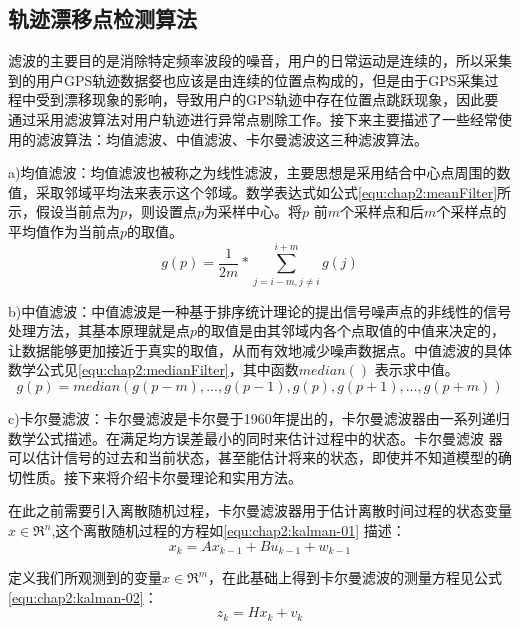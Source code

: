 \subsection{轨迹漂移点检测算法}
\label{sec:section2-1-1}
滤波的主要目的是消除特定频率波段的噪音，用户的日常运动是连续的，所以采集到的用户GPS轨迹数据㛑也应该是由连续的位置点构成的，但是由于GPS采集过程中受到漂移现象的影响，导致用户的GPS轨迹中存在位置点跳跃现象，因此要通过采用滤波算法对用户轨迹进行异常点剔除工作。接下来主要描述了一些经常使用的滤波算法：均值滤波、中值滤波、卡尔曼滤波这三种滤波算法。
\par a)均值滤波：均值滤波也被称之为线性滤波，主要思想是采用结合中心点周围的数值，采取邻域平均法来表示这个邻域。数学表达式如公式\ref{equ:chap2:meanFilter}所示，假设当前点为$p$，则设置点$p$为采样中心。将$p$ 前$m$个采样点和后$m$个采样点的平均值作为当前点$p$的取值。
\begin{equation}
\label{equ:chap2:meanFilter}
g(p)=\frac{1}{2m} \ast \sum_{j=i-m,j\neq i}^{i+m}g(j)
\end{equation}
\par b)中值滤波：中值滤波是一种基于排序统计理论的提出信号噪声点的非线性的信号处理方法，其基本原理就是点$p$的取值是由其邻域内各个点取值的中值来决定的，让数据能够更加接近于真实的取值，从而有效地减少噪声数据点。中值滤波的具体数学公式见\ref{equ:chap2:medianFilter}，其中函数$median()$ 表示求中值。
\begin{equation}
\label{equ:chap2:medianFilter}
g(p)=median({g(p-m),...,g(p-1),g(p),g(p+1),...,g(p+m)})
\end{equation}
\par c)卡尔曼滤波：卡尔曼滤波是卡尔曼于1960年提出的，卡尔曼滤波器由一系列递归数学公式描述。在满足均方误差最小的同时来估计过程中的状态。卡尔曼滤波
器可以估计信号的过去和当前状态，甚至能估计将来的状态，即使并不知道模型的确切性质。接下来将介绍卡尔曼理论和实用方法。
\par 在此之前需要引入离散随机过程，卡尔曼滤波器用于估计离散时间过程的状态变量$x\in \Re^{n}$,这个离散随机过程的方程如\ref{equ:chap2:kalman-01} 描述：
\begin{equation}
\label{equ:chap2:kalman-01}
x_{k}=Ax_{k-1}+Bu_{k-1}+w_{k-1}
\end{equation}
\par 定义我们所观测到的变量$x\in \Re^{m}$，在此基础上得到卡尔曼滤波的测量方程见公式\ref{equ:chap2:kalman-02}：
\begin{equation}
\label{equ:chap2:kalman-02}
z_{k}=Hx_{k}+v_{k}
\end{equation}

